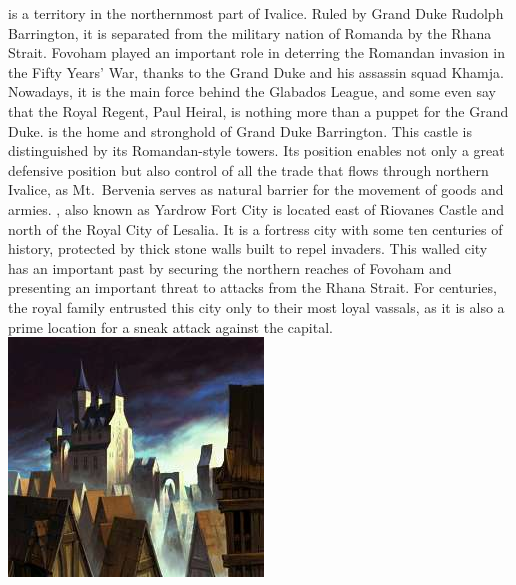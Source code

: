 %
\vspace*{\fill}
%
 is a territory in the northernmost part of Ivalice. 
Ruled by Grand Duke Rudolph Barrington, it is separated from the military nation of Romanda by the Rhana Strait. 
Fovoham played an important role in deterring the Romandan invasion in the Fifty Years' War, thanks to the Grand Duke and his assassin squad Khamja. Nowadays, it is the main force behind the Glabados League, and some even say that the Royal Regent, Paul Heiral, is nothing more than a puppet for the
Grand Duke.
 is the home and stronghold of Grand Duke Barrington. 
This castle is distinguished by its Romandan-style towers.
Its position enables not only a great defensive position but also control of all the trade that flows through northern Ivalice, as Mt.~Bervenia serves as natural barrier for the movement of goods and armies.
, also known as Yardrow Fort City is located east of Riovanes Castle and north of the Royal City of Lesalia. It is a fortress city with some ten centuries of history, protected by thick stone walls built to repel invaders. 
This walled city has an important past by securing the northern reaches of Fovoham and presenting an important threat to attacks from the Rhana Strait. 
For centuries, the royal family entrusted this city only to their most loyal vassals, as it is also a prime location for a sneak attack against the capital.
%
\newpage
%
\vspace*{\fill}
\includegraphics[width=\columnwidth]{./art/worldbook/riovanes.jpg}
